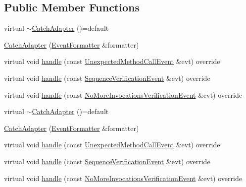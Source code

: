\subsection*{Public Member Functions}
\begin{DoxyCompactItemize}
\item 
virtual \mbox{\hyperlink{classfakeit_1_1CatchAdapter_a3f6e5a8dee88289b9d59f3e73c828662}{$\sim$\+Catch\+Adapter}} ()=default
\item 
\mbox{\hyperlink{classfakeit_1_1CatchAdapter_acb482ad797e56b07cc0e019d1db0c323}{Catch\+Adapter}} (\mbox{\hyperlink{structfakeit_1_1EventFormatter}{Event\+Formatter}} \&formatter)
\item 
virtual void \mbox{\hyperlink{classfakeit_1_1CatchAdapter_aa6269004e30a0ecee8456f4a0e1681ff}{handle}} (const \mbox{\hyperlink{structfakeit_1_1UnexpectedMethodCallEvent}{Unexpected\+Method\+Call\+Event}} \&evt) override
\item 
virtual void \mbox{\hyperlink{classfakeit_1_1CatchAdapter_ab4108a6770a6f02082e7662dbf4b836c}{handle}} (const \mbox{\hyperlink{structfakeit_1_1SequenceVerificationEvent}{Sequence\+Verification\+Event}} \&evt) override
\item 
virtual void \mbox{\hyperlink{classfakeit_1_1CatchAdapter_a44c05bbd7a09c63f357ef94345d085f5}{handle}} (const \mbox{\hyperlink{structfakeit_1_1NoMoreInvocationsVerificationEvent}{No\+More\+Invocations\+Verification\+Event}} \&evt) override
\item 
virtual \mbox{\hyperlink{classfakeit_1_1CatchAdapter_a3f6e5a8dee88289b9d59f3e73c828662}{$\sim$\+Catch\+Adapter}} ()=default
\item 
\mbox{\hyperlink{classfakeit_1_1CatchAdapter_acb482ad797e56b07cc0e019d1db0c323}{Catch\+Adapter}} (\mbox{\hyperlink{structfakeit_1_1EventFormatter}{Event\+Formatter}} \&formatter)
\item 
virtual void \mbox{\hyperlink{classfakeit_1_1CatchAdapter_aa6269004e30a0ecee8456f4a0e1681ff}{handle}} (const \mbox{\hyperlink{structfakeit_1_1UnexpectedMethodCallEvent}{Unexpected\+Method\+Call\+Event}} \&evt) override
\item 
virtual void \mbox{\hyperlink{classfakeit_1_1CatchAdapter_ab4108a6770a6f02082e7662dbf4b836c}{handle}} (const \mbox{\hyperlink{structfakeit_1_1SequenceVerificationEvent}{Sequence\+Verification\+Event}} \&evt) override
\item 
virtual void \mbox{\hyperlink{classfakeit_1_1CatchAdapter_a44c05bbd7a09c63f357ef94345d085f5}{handle}} (const \mbox{\hyperlink{structfakeit_1_1NoMoreInvocationsVerificationEvent}{No\+More\+Invocations\+Verification\+Event}} \&evt) override
\end{DoxyCompactItemize}


